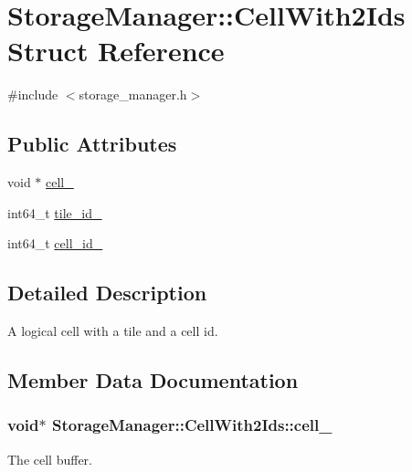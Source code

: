 \hypertarget{structStorageManager_1_1CellWith2Ids}{}\section{Storage\+Manager\+:\+:Cell\+With2\+Ids Struct Reference}
\label{structStorageManager_1_1CellWith2Ids}


{\ttfamily \#include $<$storage\+\_\+manager.\+h$>$}

\subsection*{Public Attributes}
\begin{DoxyCompactItemize}
\item 
void $\ast$ \hyperlink{structStorageManager_1_1CellWith2Ids_a7bea1629619356c516b0ea9d239f95c3}{cell\+\_\+}
\item 
int64\+\_\+t \hyperlink{structStorageManager_1_1CellWith2Ids_aba82daca6b6c2257ae7fa6e67fcc79d9}{tile\+\_\+id\+\_\+}
\item 
int64\+\_\+t \hyperlink{structStorageManager_1_1CellWith2Ids_a93c3a34f73ae7e7b421a1be1e993a3db}{cell\+\_\+id\+\_\+}
\end{DoxyCompactItemize}


\subsection{Detailed Description}
A logical cell with a tile and a cell id. 

\subsection{Member Data Documentation}
\hypertarget{structStorageManager_1_1CellWith2Ids_a7bea1629619356c516b0ea9d239f95c3}{}
\subsubsection[{cell\+\_\+}]{\setlength{\rightskip}{0pt plus 5cm}void$\ast$ Storage\+Manager\+::\+Cell\+With2\+Ids\+::cell\+\_\+}\label{structStorageManager_1_1CellWith2Ids_a7bea1629619356c516b0ea9d239f95c3}
The cell buffer. \hypertarget{structStorageManager_1_1CellWith2Ids_a93c3a34f73ae7e7b421a1be1e993a3db}{}
